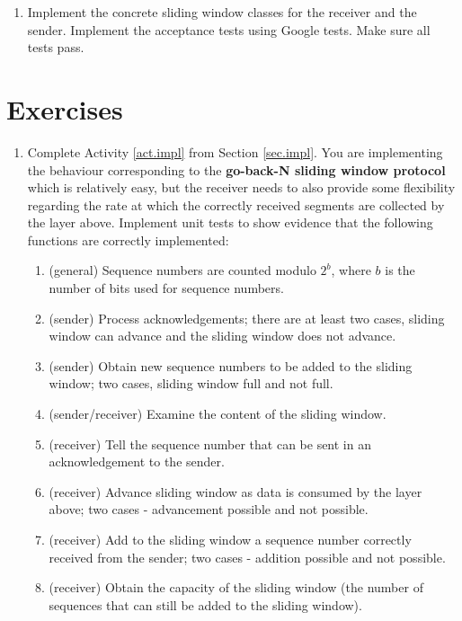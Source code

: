 \documentclass[12pt]{book}
\begin{document}
\begin{enumerate}[resume*]
\item\label{act.impl} Implement the concrete sliding window classes for the receiver and the sender. Implement the acceptance tests using Google tests. Make sure all tests pass. 

\end{enumerate}

\section{Exercises}

\begin{enumerate}[label=\arabic*.]
\item Complete Activity \ref{act.impl} from Section \ref{sec.impl}. You are implementing the behaviour corresponding to the \textbf{go-back-N sliding window protocol} which is relatively easy, but the receiver needs to also provide some flexibility regarding the rate at which the correctly received segments are collected by the layer above. Implement unit tests to show evidence that the following functions are correctly implemented:
  \begin{enumerate}[label=(\alph*)]
  \item (general) Sequence numbers are counted modulo $2^b$, where $b$ is the number of bits used for sequence numbers.
  \item (sender) Process acknowledgements; there are at least two cases, sliding window can advance and the sliding window does not advance.
  \item (sender) Obtain new sequence numbers to be added to the sliding window; two cases, sliding window full and not full.
  \item (sender/receiver) Examine the content of the sliding window.
  \item (receiver) Tell the sequence number that can be sent in an acknowledgement to the sender.
  \item (receiver) Advance sliding window as data is consumed by the layer above; two cases - advancement possible and not possible.
  \item (receiver) Add to the sliding window a sequence number correctly received from the sender; two cases - addition possible and not possible.
  \item (receiver) Obtain the capacity of the sliding window (the number of sequences that can still be added to the sliding window).
  \end{enumerate}


\end{enumerate}
\end{document}
